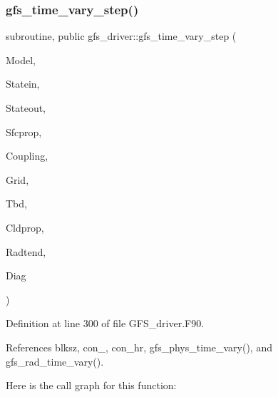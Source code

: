 \subsubsection{gfs\+\_\+time\+\_\+vary\+\_\+step()}
{\footnotesize\ttfamily subroutine, public gfs\+\_\+driver\+::gfs\+\_\+time\+\_\+vary\+\_\+step (\begin{DoxyParamCaption}\item[{type(gfs\+\_\+control\+\_\+type), intent(inout)}]{Model,  }\item[{type(gfs\+\_\+statein\+\_\+type), dimension(\+:), intent(inout)}]{Statein,  }\item[{type(gfs\+\_\+stateout\+\_\+type), dimension(\+:), intent(inout)}]{Stateout,  }\item[{type(gfs\+\_\+sfcprop\+\_\+type), dimension(\+:), intent(inout)}]{Sfcprop,  }\item[{type(gfs\+\_\+coupling\+\_\+type), dimension(\+:), intent(inout)}]{Coupling,  }\item[{type(gfs\+\_\+grid\+\_\+type), dimension(\+:), intent(inout)}]{Grid,  }\item[{type(gfs\+\_\+tbd\+\_\+type), dimension(\+:), intent(inout)}]{Tbd,  }\item[{type(gfs\+\_\+cldprop\+\_\+type), dimension(\+:), intent(inout)}]{Cldprop,  }\item[{type(gfs\+\_\+radtend\+\_\+type), dimension(\+:), intent(inout)}]{Radtend,  }\item[{type(gfs\+\_\+diag\+\_\+type), dimension(\+:), intent(inout)}]{Diag }\end{DoxyParamCaption})}



Definition at line 300 of file G\+F\+S\+\_\+driver.\+F90.



References blksz, con\+\_, con\+\_\+hr, gfs\+\_\+phys\+\_\+time\+\_\+vary(), and gfs\+\_\+rad\+\_\+time\+\_\+vary().

Here is the call graph for this function\+:
\mbox{\label{namespacegfs__driver_a913f6dc554990798c132f51cf053b2fb}} 
